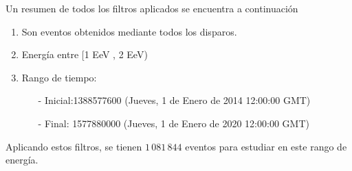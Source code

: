 	Un resumen de todos los filtros aplicados se encuentra a continuación
		\begin{enumerate}
			\item Son eventos obtenidos mediante todos los disparos.
			\item Energía entre  [1 EeV , 2 EeV)
			\item Rango de tiempo:
			\begin{itemize}
				\item[-] Inicial:1388577600 (Jueves, 1 de Enero de 2014 12:00:00 GMT)
				\item[-] Final: 1577880000  (Jueves, 1 de Enero de 2020 12:00:00 GMT)
			\end{itemize}

		\end{enumerate}
	Aplicando estos filtros, se tienen $1\,081\,844$ eventos para estudiar en este rango de energía. 


